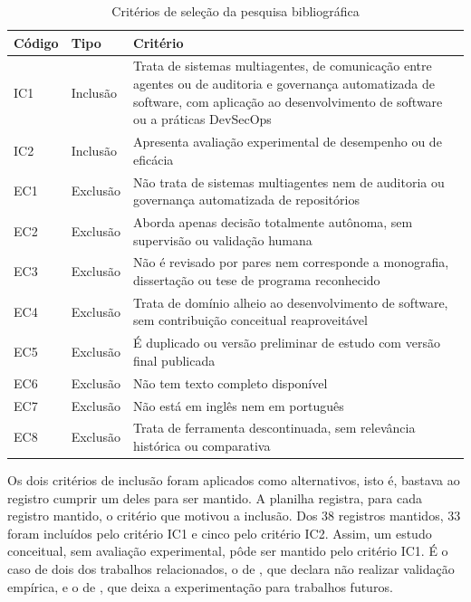 \begin{table}[htbp]
\centering
\caption{Critérios de seleção da pesquisa bibliográfica}
\label{tab-criterios}
\begingroup
\footnotesize
\SingleSpacing
\setlength{\tabcolsep}{4pt}
\renewcommand{\arraystretch}{1.15}
\begin{tabularx}{\textwidth}{>{\raggedright\arraybackslash}p{1.35cm}>{\raggedright\arraybackslash}p{1.8cm}>{\raggedright\arraybackslash}X}
\hline
\textbf{Código} & \textbf{Tipo} & \textbf{Critério} \\ \hline
IC1 & Inclusão & Trata de sistemas multiagentes, de comunicação entre agentes ou de auditoria e governança automatizada de software, com aplicação ao desenvolvimento de software ou a práticas DevSecOps \\ \hline
IC2 & Inclusão & Apresenta avaliação experimental de desempenho ou de eficácia \\ \hline
EC1 & Exclusão & Não trata de sistemas multiagentes nem de auditoria ou governança automatizada de repositórios \\ \hline
EC2 & Exclusão & Aborda apenas decisão totalmente autônoma, sem supervisão ou validação humana \\ \hline
EC3 & Exclusão & Não é revisado por pares nem corresponde a monografia, dissertação ou tese de programa reconhecido \\ \hline
EC4 & Exclusão & Trata de domínio alheio ao desenvolvimento de software, sem contribuição conceitual reaproveitável \\ \hline
EC5 & Exclusão & É duplicado ou versão preliminar de estudo com versão final publicada \\ \hline
EC6 & Exclusão & Não tem texto completo disponível \\ \hline
EC7 & Exclusão & Não está em inglês nem em português \\ \hline
EC8 & Exclusão & Trata de ferramenta descontinuada, sem relevância histórica ou comparativa \\ \hline
\end{tabularx}
\endgroup
{}
\end{table}

Os dois critérios de inclusão foram aplicados como alternativos, isto é, bastava ao registro cumprir um deles para ser mantido. A planilha registra, para cada registro mantido, o critério que motivou a inclusão. Dos 38 registros mantidos, 33 foram incluídos pelo critério IC1 e cinco pelo critério IC2. Assim, um estudo conceitual, sem avaliação experimental, pôde ser mantido pelo critério IC1. É o caso de dois dos trabalhos relacionados, o de , que declara não realizar validação empírica, e o de , que deixa a experimentação para trabalhos futuros.

